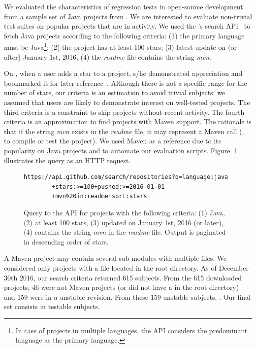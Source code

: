 We evaluated the characteristics of regression tests in open-source
development from a sample set of Java projects from \github{}.  We are
interested to evaluate non-trivial test suites on popular projects
that are in activity. We used the \github{}'s search
API~\cite{githubsearch} to fetch Java projects according to the
following criteria: (1) the primary language must be Java\footnote{In
case of projects in multiple languages, the \github{} API considers
the predominant language as the primary language.}; (2) the project
has at least 100 stars; (3) latest update on (or after) January 1st,
2016; (4) the \emph{readme} file contains the string \emph{mvn}.

On \github{}, when a user adds a star to a project, s/he demonstrated
appreciation and bookmarked it for later
reference~\cite{github-stars}.  Although there is not a specific range
for the number of stars, our criteria is an estimation to avoid
trivial subjects: we assumed that \github{} users are likely to
demonstrate interest on well-tested projects. The third criteria is a
constraint to skip projects without recent activity. The fourth
criteria is an approximation to find projects with Maven support. The
rationale is that if the string \emph{mvn} exists in the \emph{readme}
file, it may represent a Maven call (\eg, to compile or test the
project). We used Maven as a reference due to its popularity on Java
projects and to automate our evaluation scripts.
Figure~\ref{fig:subject-query} illustrates the query as an HTTP
request.

\begin{figure}[h!]
\centering
\scriptsize
{}
\begin{lstlisting}
https://api.github.com/search/repositories?q=language:java
        +stars:>=100+pushed:>=2016-01-01
        +mvn%20in:readme+sort:stars
\end{lstlisting}
    \caption{\label{fig:subject-query} Query to the \github{} API for
    projects with the following criteria: (1) Java, (2) at least 100
    stars, (3) updated on January 1st, 2016 (or later), (4) contains
    the string \emph{mvn} in the \emph{readme} file. Output is
    paginated in descending order of stars.}
\end{figure}

A Maven project may contain several sub-modules with multiple \pomf{}
files. We considered only projects with a \pomf{} file located in the
root directory.  As of December 30th 2016, our search criteria
returned 615 subjects. From the 615 downloaded projects, 46 were not
Maven projects (or did not have a \pomf{} in the root directory) and
159 were in a unstable revision.  From these 159 unstable subjects,
. Our
final set consists in \numSubjs{} testable subjects.


